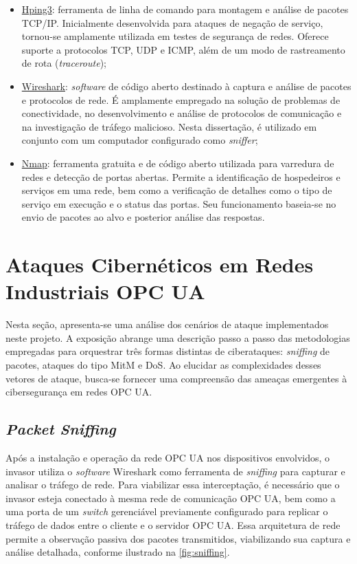 \begin{itemize}
            \item \underline{Hping3}: ferramenta de linha de comando para montagem e análise de pacotes TCP/IP. Inicialmente desenvolvida para ataques de negação de serviço, tornou-se amplamente utilizada em testes de segurança de redes. Oferece suporte a protocolos TCP, UDP e ICMP, além de um modo de rastreamento de rota (\textit{traceroute});
            \item \underline{Wireshark}: \textit{software} de código aberto destinado à captura e análise de pacotes e protocolos de rede. É amplamente empregado na solução de problemas de conectividade, no desenvolvimento e análise de protocolos de comunicação e na investigação de tráfego malicioso. Nesta dissertação, é utilizado em conjunto com um computador configurado como \textit{sniffer};
            \item \underline{Nmap}: ferramenta gratuita e de código aberto utilizada para varredura de redes e detecção de portas abertas. Permite a identificação de hospedeiros e serviços em uma rede, bem como a verificação de detalhes como o tipo de serviço em execução e o status das portas. Seu funcionamento baseia-se no envio de pacotes ao alvo e posterior análise das respostas.
        \end{itemize}

\section{Ataques Cibernéticos em Redes Industriais OPC UA} \label{sec:attacks}

    Nesta seção, apresenta-se uma análise dos cenários de ataque implementados neste projeto. A exposição abrange uma descrição passo a passo das metodologias empregadas para orquestrar três formas distintas de ciberataques: \textit{sniffing} de pacotes, ataques do tipo MitM e DoS. Ao elucidar as complexidades desses vetores de ataque, busca-se fornecer uma compreensão das ameaças emergentes à cibersegurança em redes OPC UA.

    \subsection{\textit{Packet Sniffing}}

        Após a instalação e operação da rede OPC UA nos dispositivos envolvidos, o invasor utiliza o \textit{software} Wireshark como ferramenta de \textit{sniffing} para capturar e analisar o tráfego de rede. Para viabilizar essa interceptação, é necessário que o invasor esteja conectado à mesma rede de comunicação OPC UA, bem como a uma porta de um \textit{switch} gerenciável previamente configurado para replicar o tráfego de dados entre o cliente e o servidor OPC UA. Essa arquitetura de rede permite a observação passiva dos pacotes transmitidos, viabilizando sua captura e análise detalhada, conforme ilustrado na \autoref{fig:sniffing}.

